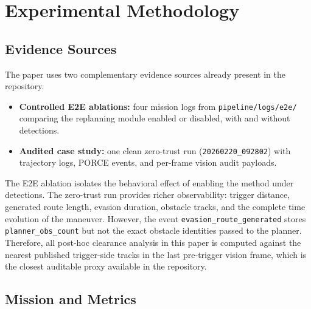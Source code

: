 \documentclass[journal,twoside,web]{ieeecolor}
\begin{document}


\section{Experimental Methodology}

\subsection{Evidence Sources}

The paper uses two complementary evidence sources already present in the repository.

\begin{itemize}

    \item \textbf{Controlled E2E ablations:} four mission logs from \texttt{pipeline/logs/e2e/} comparing the replanning module enabled or disabled, with and without detections.
    \item \textbf{Audited case study:} one clean zero-trust run (\texttt{20260220\_092802}) with trajectory logs, PORCE events, and per-frame vision audit payloads.
\end{itemize}

The E2E ablation isolates the behavioral effect of enabling the method under detections. The zero-trust run provides richer observability: trigger distance, generated route length, evasion duration, obstacle tracks, and the complete time evolution of the maneuver. However, the event \texttt{evasion\_route\_generated} stores \texttt{planner\_obs\_count} but not the exact obstacle identities passed to the planner. Therefore, all post-hoc clearance analysis in this paper is computed against the nearest published trigger-side tracks in the last pre-trigger vision frame, which is the closest auditable proxy available in the repository.

\subsection{Mission and Metrics}
\end{document}
